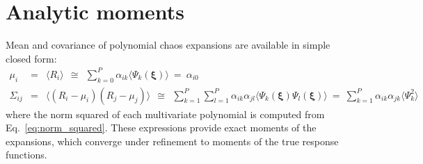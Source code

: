\section{Analytic moments} \label{uq:expansion:moment}

Mean and covariance of polynomial chaos expansions are available
in simple closed form:
\begin{eqnarray}
\mu_i      &=& \langle R_i \rangle ~~\cong~~ \sum_{k=0}^P \alpha_{ik} \langle 
\Psi_k(\boldsymbol{\xi}) \rangle ~=~ \alpha_{i0} \label{eq:mean_pce} \\
\Sigma_{ij} &=& \langle (R_i - \mu_i)(R_j - \mu_j) \rangle ~~\cong~~ 
\sum_{k=1}^P \sum_{l=1}^P \alpha_{ik} \alpha_{jl}
\langle \Psi_k(\boldsymbol{\xi}) \Psi_l(\boldsymbol{\xi}) \rangle ~=~
\sum_{k=1}^P \alpha_{ik}\alpha_{jk} \langle \Psi^2_k \rangle~~~~~~~~ \label{eq:covar_pce} 
\end{eqnarray}
where the norm squared of each multivariate polynomial is computed
from Eq.~\ref{eq:norm_squared}.  These expressions provide exact moments 
of the expansions, which converge under refinement to moments of the 
true response functions.


